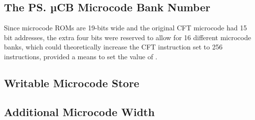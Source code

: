 \subsection{The \ps{µCB} Microcode Bank Number}
\label{sec:ucb}
Since microcode ROMs are 19-bits wide and the original CFT microcode
had 15 bit addresses, the extra four bits were reserved to allow for 16
different microcode banks, which could theoretically increase the CFT
instruction set to 256 instructions, provided a means to set the value of
\UCB.

\subsection{Writable Microcode Store}


\subsection{Additional Microcode Width}



